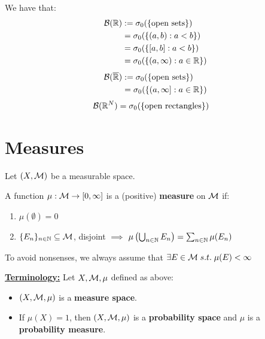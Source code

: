 \begin{fremark}
    We have that:
    \begin{align*}
        \mathcal{B}(\mathbb{R}) &:= \sigma_0(\{\text{open sets}\})\\
        &= \sigma_0(\{(a, b): a < b\})\\
        &= \sigma_0(\{[a, b]: a < b\})\\
        &= \sigma_0(\{(a, \infty): a \in \mathbb{R}\})
    \end{align*}
    \begin{align*}
        \mathcal{B}(\overline{\mathbb{R}}) &:= \sigma_0(\{\text{open sets}\})\\
        &= \sigma_0(\{(a, \infty]: a \in \mathbb{R}\})
    \end{align*}
    \begin{align*}
        \mathcal{B}(\mathbb{R}^N) &= \sigma_0(\{\text{open rectangles}\})
    \end{align*}
\end{fremark}

\section{Measures}

Let $(X, \mathcal{M})$ be a measurable space.

\begin{fdefinition}
    A function $\mu: \mathcal{M} \to [0, \infty]$ is a (positive) \textbf{measure} on $\mathcal{M}$ if:
    \vspace{1em}
    \begin{enumerate}[label=(\roman*)]
        \item $\mu(\emptyset) = 0$
        \vspace{1em}
        \item $\{E_n\}_{n \in \mathbb{N}} \subseteq \mathcal{M}$, disjoint $\implies$ $\mu \left(\bigcup_{n \in \mathbb{N}} E_n\right) = \sum_{n \in \mathbb{N}} \mu(E_n)$
    \end{enumerate}
\end{fdefinition}

\begin{note}
    To avoid nonsenses, we always assume that $\exists E \in \mathcal{M} \;s.t.\; \mu(E) < \infty$
\end{note}

\underline{\textbf{Terminology:}} Let $X, \mathcal{M}, \mu$ defined as above:

\begin{itemize}
    \item $(X, \mathcal{M}, \mu)$ is a \textbf{measure space}.
    \item If $\mu(X) = 1$, then $(X, \mathcal{M}, \mu)$ is a \textbf{probability space} and $\mu$ is 
    a \textbf{probability measure}.
\end{itemize}

